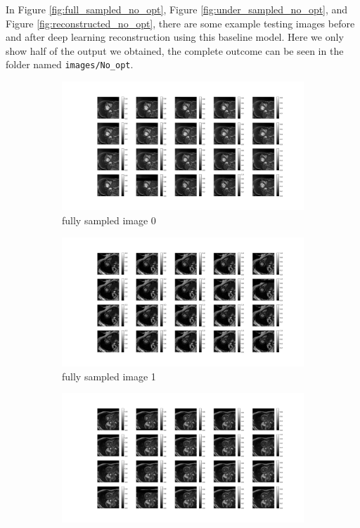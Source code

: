 \documentclass{article}
\begin{document}
In Figure \ref{fig:full_sampled_no_opt}, Figure \ref{fig:under_sampled_no_opt}, and Figure \ref{fig:reconstructed_no_opt}, there are some example testing images before and after deep learning reconstruction using this baseline model. Here we only show half of the output we obtained, the complete outcome can be seen in the folder named \texttt{images/No\_opt}.
\begin{figure}[ht]
  \centering
  \begin{subfigure}[b]{0.8\linewidth}
    \includegraphics[width=\linewidth]{../images/No_opt/full_sampling/full_sampling_0.png}
    \caption{fully sampled image 0}
  \end{subfigure}
  \quad
  \begin{subfigure}[b]{0.8\linewidth}
    \includegraphics[width=\linewidth]{../images/No_opt/full_sampling/full_sampling_1.png}
    \caption{fully sampled image 1}
  \end{subfigure}
  \quad
  \begin{subfigure}[b]{0.8\linewidth}
    \includegraphics[width=\linewidth]{../images/No_opt/full_sampling/full_sampling_2.png}

\end{subfigure}
\end{figure}
\end{document}
